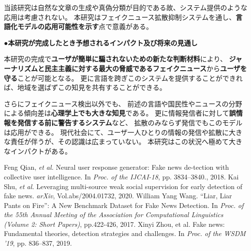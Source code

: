 {	当該研究は⾃然な文章の⽣成や真偽分類が⽬的である故、システム提供のような応⽤は考慮されない。
	本研究はフェイクニュース拡散抑制システムを通し、\textbf{⾔語化モデルの応⽤可能性を⽰す}点で意義がある。

	\noindent
	●\textbf{本研究が完成したとき予想されるインパクト及び将来の見通し}
	
	本研究の完成で\textbf{ユーザが簡単に騙されないための新たな判断材料}により、
	\textbf{ジャーナリズムと民主主義に対する最大の脅威であるフェイクニュース}\cite{zhou2019wsdm}から\textbf{ユーザを守る}ことが可能となる。
	更に言語を跨ぎこのシステムを提供することができれば、地域を選ばずこの知見を共有することができる。
	
	さらにフェイクニュース検出以外でも、
	前述の言語や国民性やニュースの分野による傾向差は\textbf{心理学上でも大きな知見}である。
	更に情報発信者に対して\textbf{誤情報を発信する前に警告するシステム}など、
	拡散のみならず発信でもこのモデルは応用ができる。
	現代社会にて、ユーザ一人ひとりの情報の発信や拡散に大きな責任が伴うが、その認識は広まっていない。
	本研究はこの状況へ極めて⼤きなインパクトがある。

	

	{\footnotesize
		\begin{thebibliography}{99}
			\setcounter{enumiv}{7}
			\vspace*{-2mm}
			\setlength{\parskip}{0cm}
			\setlength{\itemsep}{0cm}
			\begin{spacing}{0.7}
				 Feng Qian, \textit{et al.} Neural user response generator: Fake news de-tection with collective user intelligence. In \textit{Proc. of the IJCAI-18}, pp. 3834–3840., 2018.
				 Kai Shu, \textit{et al.} Leveraging multi-source weak social supervision for early detection of fake news. \textit{arXiv}, Vol.abs/2004.01732, 2020.
				William Yang Wang. ``Liar, Liar Pants on Fire'': A New Benchmark Dataset for Fake News Detection. In \textit{Proc. of the 55th Annual Meeting of the Association for Computational Linguistics (Volume 2: Short Papers)}, pp.422-426, 2017.
				Xinyi Zhou, et al. Fake news: Fundamental theories, detection strategies and challenges. In \textit{Proc. of the WSDM '19}, pp. 836–837, 2019.
			\end{spacing}
		\end{thebibliography}
	}
}

